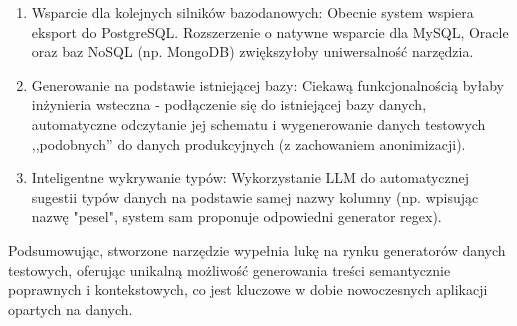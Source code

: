 \begin{enumerate}
    \item Wsparcie dla kolejnych silników bazodanowych: Obecnie system wspiera eksport do PostgreSQL. Rozszerzenie o natywne wsparcie dla MySQL, Oracle oraz baz NoSQL (np. MongoDB) zwiększyłoby uniwersalność narzędzia.
    \item Generowanie na podstawie istniejącej bazy: Ciekawą funkcjonalnością byłaby inżynieria wsteczna - podłączenie się do istniejącej bazy danych, automatyczne odczytanie jej schematu i wygenerowanie danych testowych ,,podobnych'' do danych produkcyjnych (z zachowaniem anonimizacji).
    \item Inteligentne wykrywanie typów: Wykorzystanie \gls{LLM} do automatycznej sugestii typów danych na podstawie samej nazwy kolumny (np. wpisując nazwę "pesel", system sam proponuje odpowiedni generator regex).
\end{enumerate}

Podsumowując, stworzone narzędzie wypełnia lukę na rynku generatorów danych testowych, oferując unikalną możliwość generowania treści semantycznie poprawnych i kontekstowych, co jest kluczowe w dobie nowoczesnych aplikacji opartych na danych.
